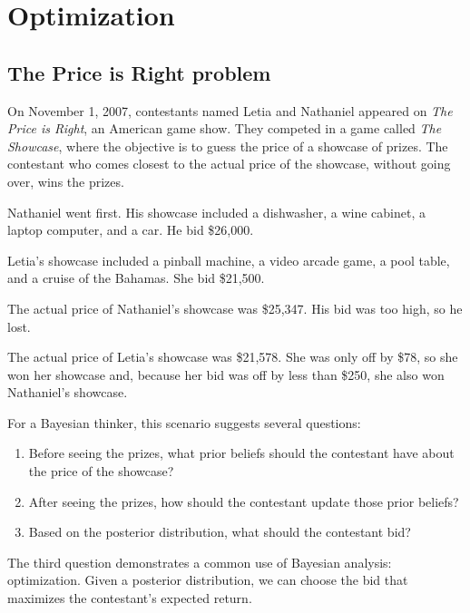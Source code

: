 \documentclass[12pt]{book}
\begin{document}
\chapter{Optimization}
\label{optimization}

\section{The Price is Right problem}

On November 1, 2007, contestants named Letia and Nathaniel appeared
on {\it The Price is Right}, an American game show.  They competed in
a game called {\it The Showcase}, where the objective is to guess the price
of a showcase of prizes.  The contestant who comes closest to the
actual price of the showcase, without going over, wins the prizes.

Nathaniel went first.  His showcase included a dishwasher, a wine
cabinet, a laptop computer, and a car.  He bid \$26,000.

Letia's showcase included a pinball machine, a video arcade game, a
pool table, and a cruise of the Bahamas.  She bid \$21,500.

The actual price of Nathaniel's showcase was \$25,347.  His bid
was too high, so he lost.

The actual price of Letia's showcase was \$21,578.  She was only
off by \$78, so she won her showcase and, because
her bid was off by less than \$250, she also won Nathaniel's
showcase.

For a Bayesian thinker, this scenario suggests several questions:

\begin{enumerate}

\item Before seeing the prizes, what prior beliefs should the
  contestant have about the price of the showcase?

\item After seeing the prizes, how should the contestant update
  those prior beliefs?

\item Based on the posterior distribution, what should the
  contestant bid?

\end{enumerate}

The third question demonstrates a common use of Bayesian analysis:
optimization.  Given a posterior distribution, we can choose
the bid that maximizes the contestant's expected return.
\end{document}
